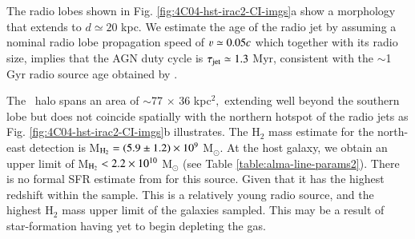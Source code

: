 The radio lobes shown in Fig. \ref{fig:4C04-hst-irac2-CI-imgs}a show a morphology that extends to $d\simeq20$ kpc. We estimate the age of the radio jet by assuming a nominal radio lobe propagation speed of $\varv \simeq0.05c$ which together with its radio size, implies that the AGN duty cycle is $\tau_{\rm jet}\simeq1.3$ Myr, consistent with the $\sim$1 Gyr radio source age obtained by \citet{Parijskij2014}.

The \lya~halo spans an area of $\sim$77 $\times$ 36 kpc$^2,$ extending well beyond the southern lobe but does not coincide spatially with the northern hotspot of the radio jets as Fig. \ref{fig:4C04-hst-irac2-CI-imgs}b illustrates. The H$_2$ mass estimate for the north-east detection is M$_{\rm H_2}=(5.9\pm1.2)\times 10^{9}$ M$_\odot.$ At the host galaxy, we obtain an upper limit of M$_{\rm H_2} < 2.2\times 10^{10}$ M$_\odot$ (see Table \ref{table:alma-line-params2}). There is no formal SFR estimate from for this source. Given that it has the highest redshift within the sample. This is a relatively young radio source, and the highest H$_2$ mass upper limit of the galaxies sampled. This may be a result of star-formation having yet to begin depleting the gas. 

